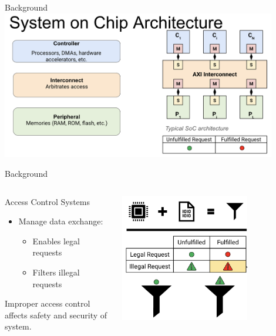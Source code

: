 \begin{frame}{Background}
    \centering
    \includegraphics[height=0.9\textheight,width=0.9\textwidth,keepaspectratio]{soc.png}
\end{frame}

\begin{frame}{Background}
    \begin{columns}
        \begin{column}{0.5\textwidth}
            Access Control Systems
            \begin{itemize}
                \item Manage data exchange:
                \begin{itemize}
                    \item Enables legal requests
                    \item Filters illegal requests 
                \end{itemize}
            \end{itemize}
            \vspace{0.5cm}
            Improper access control affects safety and security of system.
        \end{column}
        \begin{column}{0.5\textwidth}
            \centering
            \includegraphics[height=0.7\textheight,width=0.7\textwidth,keepaspectratio]{acp.png}
        \end{column}
    \end{columns}
\end{frame}

